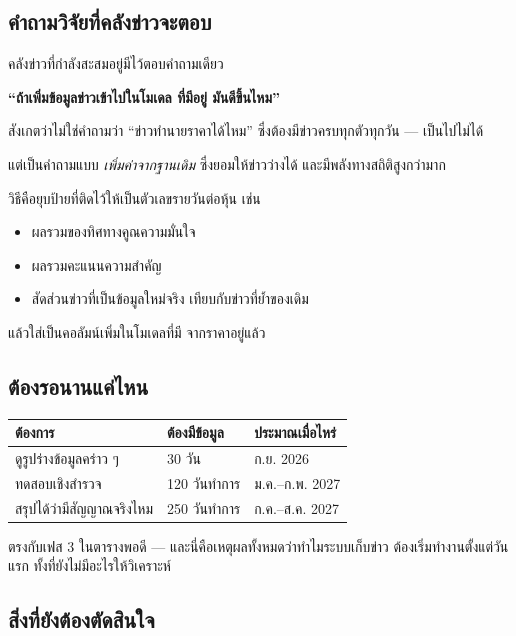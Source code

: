 \documentclass[11pt]{article}
\begin{document}
\subsection{คำถามวิจัยที่คลังข่าวจะตอบ}

คลังข่าวที่กำลังสะสมอยู่มีไว้ตอบคำถามเดียว

\begin{keypoint}
\textbf{``ถ้าเพิ่มข้อมูลข่าวเข้าไปในโมเดล  ที่มีอยู่ มันดีขึ้นไหม''}

สังเกตว่าไม่ใช่คำถามว่า ``ข่าวทำนายราคาได้ไหม'' ซึ่งต้องมีข่าวครบทุกตัวทุกวัน
--- เป็นไปไม่ได้

แต่เป็นคำถามแบบ \emph{เพิ่มค่าจากฐานเดิม} ซึ่งยอมให้ข่าวว่างได้
และมีพลังทางสถิติสูงกว่ามาก
\end{keypoint}

วิธีคือยุบป้ายที่ติดไว้ให้เป็นตัวเลขรายวันต่อหุ้น เช่น

\begin{itemize}
\item ผลรวมของทิศทางคูณความมั่นใจ
\item ผลรวมคะแนนความสำคัญ
\item สัดส่วนข่าวที่เป็นข้อมูลใหม่จริง เทียบกับข่าวที่ย้ำของเดิม
\end{itemize}

แล้วใส่เป็นคอลัมน์เพิ่มในโมเดลที่มี  จากราคาอยู่แล้ว

\subsection{ต้องรอนานแค่ไหน}

\begin{center}
\small
\begin{tabular}{lll}
\toprule
ต้องการ & ต้องมีข้อมูล & ประมาณเมื่อไหร่ \\
\midrule
ดูรูปร่างข้อมูลคร่าว ๆ & 30 วัน & ก.ย. 2026 \\
ทดสอบเชิงสำรวจ & 120 วันทำการ & ม.ค.--ก.พ. 2027 \\
สรุปได้ว่ามีสัญญาณจริงไหม & 250 วันทำการ & ก.ค.--ส.ค. 2027 \\
\bottomrule
\end{tabular}
\end{center}

ตรงกับเฟส 3 ในตารางพอดี --- และนี่คือเหตุผลทั้งหมดว่าทำไมระบบเก็บข่าว
ต้องเริ่มทำงานตั้งแต่วันแรก ทั้งที่ยังไม่มีอะไรให้วิเคราะห์

\subsection{สิ่งที่ยังต้องตัดสินใจ}
\end{document}
